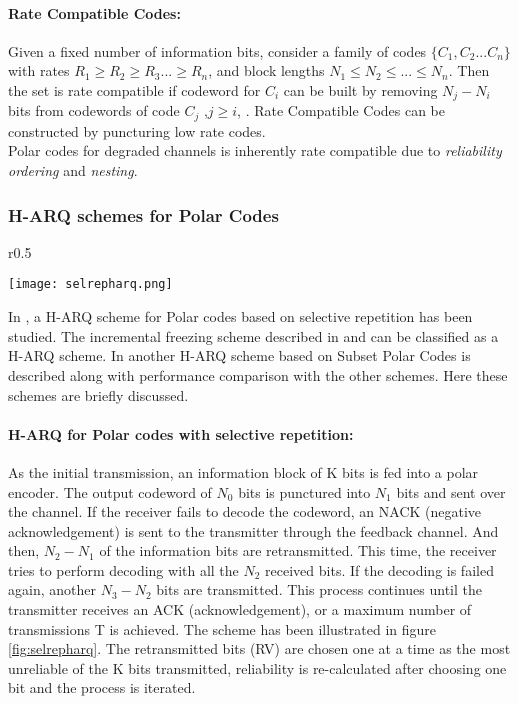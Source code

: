 \documentclass[
11pt, %
a4paper, %
oneside, %
headinclude,footinclude, %
BCOR5mm, %
]{scrartcl}
\begin{document}
\paragraph{Rate Compatible Codes:}
Given a fixed number of information bits, consider a family of codes $\{C_1,C_2...C_n\}$  with rates $R_1\geq R_2\geq R_3...\geq R_n$, and block lengths $N_1 \leq N_2 \leq ... \leq N_n$.
Then the set is rate compatible if codeword for $C_i$ can be built by removing $N_j-N_i$ bits from codewords of code $C_j$ ,$j\geq i$, \cite{mondelli}. Rate Compatible Codes can be constructed by puncturing low rate codes. 
\\Polar codes for degraded channels is inherently rate compatible due to \emph{reliability ordering} and \emph{nesting}.

\subsubsection*{H-ARQ schemes for Polar Codes}
\begin{wrapfigure}{r}{0.5\textwidth}
  \begin{center}
    \texttt{[image: selrepharq.png]}
  \end{center}
  \caption{H-ARQ for Polar Codes with selective repetition}
  \label{fig:selrepharq}
\end{wrapfigure}
In \cite{harqchen}, a H-ARQ scheme for Polar codes based on selective repetition has been studied. The incremental freezing scheme described in \cite{chen} and \cite{mondelli} can be classified as a H-ARQ scheme. In \cite{harqtav} another H-ARQ scheme based on Subset Polar Codes is described along with performance comparison with the other schemes. Here these schemes are briefly discussed. 
\paragraph{H-ARQ for Polar codes with selective repetition:}
As the initial transmission, an information block of K bits is fed into a polar
encoder. The output codeword of $N_0$ bits is punctured into $N_1$
bits and sent over the channel. If the receiver fails to decode
the codeword, an NACK (negative acknowledgement) is sent
to the transmitter through the feedback channel. And then,
$N_2-N_1$ of the information bits are retransmitted. This time,
the receiver tries to perform decoding with all the $N_2$ received
bits. If the decoding is failed again, another $N_3-N_2$ bits
are transmitted. This process continues until the transmitter
receives an ACK (acknowledgement), or a maximum number
of transmissions T is achieved. The scheme has been illustrated in figure  \ref{fig:selrepharq}. The retransmitted bits (RV) are chosen one at a time as the most unreliable of the K bits transmitted, reliability is re-calculated after choosing one bit and the process is iterated.
\end{document}
